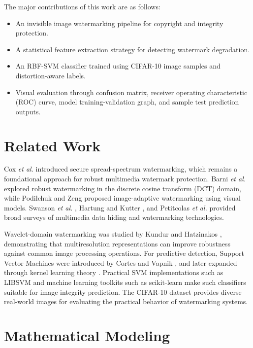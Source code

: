 \documentclass[conference]{IEEEtran}
\begin{document}
The major contributions of this work are as follows:
\begin{itemize}
    \item An invisible image watermarking pipeline for copyright and integrity protection.
    \item A statistical feature extraction strategy for detecting watermark degradation.
    \item An RBF-SVM classifier trained using CIFAR-10 image samples and distortion-aware labels.
    \item Visual evaluation through confusion matrix, receiver operating characteristic (ROC) curve, model training-validation graph, and sample test prediction outputs.
\end{itemize}

\section{Related Work}
Cox \textit{et al.} \cite{cox1997secure} introduced secure spread-spectrum watermarking, which remains a foundational approach for robust multimedia watermark protection. Barni \textit{et al.} \cite{barni1998dct} explored robust watermarking in the discrete cosine transform (DCT) domain, while Podilchuk and Zeng \cite{podilchuk1998image} proposed image-adaptive watermarking using visual models. Swanson \textit{et al.} \cite{swanson1998multimedia}, Hartung and Kutter \cite{hartung1999multimedia}, and Petitcolas \textit{et al.} \cite{petitcolas1999information} provided broad surveys of multimedia data hiding and watermarking technologies.

Wavelet-domain watermarking was studied by Kundur and Hatzinakos \cite{kundur1998digital}, demonstrating that multiresolution representations can improve robustness against common image processing operations. For predictive detection, Support Vector Machines were introduced by Cortes and Vapnik \cite{cortes1995support}, and later expanded through kernel learning theory \cite{scholkopf2002learning}. Practical SVM implementations such as LIBSVM \cite{chang2011libsvm} and machine learning toolkits such as scikit-learn \cite{pedregosa2011scikit} make such classifiers suitable for image integrity prediction. The CIFAR-10 dataset \cite{krizhevsky2009learning} provides diverse real-world images for evaluating the practical behavior of watermarking systems.

\section{Mathematical Modeling}
\end{document}

